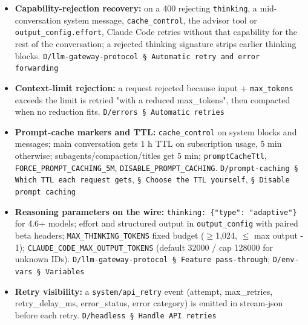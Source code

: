 \begin{itemize}
\item \textbf{Capability-rejection recovery:} on a 400 rejecting \texttt{thinking}, a mid-conversation system message, \texttt{cache\_\allowbreak{}control}, the advisor tool or \texttt{output\_\allowbreak{}config.\allowbreak{}effort}, Claude Code retries without that capability for the rest of the conversation; a rejected thinking signature strips earlier thinking blocks. \texttt{D/\allowbreak{}llm-\allowbreak{}gateway-\allowbreak{}protocol § Automatic retry and error forwarding}
\item \textbf{Context-limit rejection:} a request rejected because input + \texttt{max\_\allowbreak{}tokens} exceeds the limit is retried "with a reduced max\_tokens", then compacted when no reduction fits. \texttt{D/\allowbreak{}errors § Automatic retries}
\item \textbf{Prompt-cache markers and TTL:} \texttt{cache\_\allowbreak{}control} on system blocks and messages; main conversation gets 1 h TTL on subscription usage, 5 min otherwise; subagents/compaction/titles get 5 min; \texttt{promptCacheTtl}, \texttt{FORCE\_\allowbreak{}PROMPT\_\allowbreak{}CACHING\_\allowbreak{}5M}, \texttt{DISABLE\_\allowbreak{}PROMPT\_\allowbreak{}CACHING}. \texttt{D/\allowbreak{}prompt-\allowbreak{}caching § Which TTL each request gets}, \texttt{§ Choose the TTL yourself}, \texttt{§ Disable prompt caching}
\item \textbf{Reasoning parameters on the wire:} \texttt{thinking:\allowbreak{} \{"type":\allowbreak{} "adaptive"\}} for 4.6+ models; effort and structured output in \texttt{output\_\allowbreak{}config} with paired beta headers; \texttt{MAX\_\allowbreak{}THINKING\_\allowbreak{}TOKENS} fixed budget ($\geq$1,024, $\leq$ max output - 1); \texttt{CLAUDE\_\allowbreak{}CODE\_\allowbreak{}MAX\_\allowbreak{}OUTPUT\_\allowbreak{}TOKENS} (default 32000 / cap 128000 for unknown IDs). \texttt{D/\allowbreak{}llm-\allowbreak{}gateway-\allowbreak{}protocol § Feature pass-\allowbreak{}through}; \texttt{D/\allowbreak{}env-\allowbreak{}vars § Variables}
\item \textbf{Retry visibility:} a \texttt{system/\allowbreak{}api\_\allowbreak{}retry} event (attempt, max\_retries, retry\_delay\_ms, error\_status, error category) is emitted in stream-json before each retry. \texttt{D/\allowbreak{}headless § Handle API retries}
\end{itemize}

